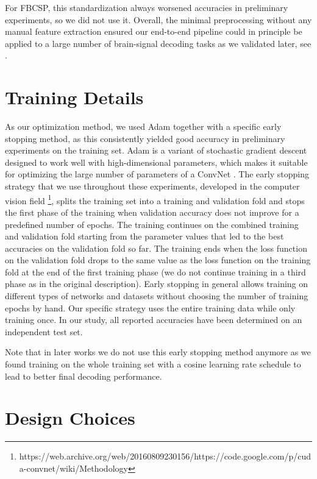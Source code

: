 For FBCSP, this standardization always worsened accuracies in
preliminary experiments, so we did not use it. Overall, the minimal
preprocessing without any manual feature extraction ensured our
end-to-end pipeline could in principle be applied to a large number of
brain-signal decoding tasks as we validated later, see
.

\section{Training Details}\label{training-details}

    As our optimization method, we used Adam
\cite{kingma_adam:_2014} together with a specific early
stopping method, as this consistently yielded good accuracy in
preliminary experiments on the training set. Adam is a variant of
stochastic gradient descent designed to work well with high-dimensional
parameters, which makes it suitable for optimizing the large number of
parameters of a ConvNet \cite{kingma_adam:_2014}. The early
stopping strategy that we use throughout these experiments, developed in
the computer vision field \footnote{https://web.archive.org/web/20160809230156/https://code.google.com/p/cuda-convnet/wiki/Methodology},
splits the training set into a training and validation fold and stops
the first phase of the training when validation accuracy does not
improve for a predefined number of epochs. The training continues on the
combined training and validation fold starting from the parameter values
that led to the best accuracies on the validation fold so far. The
training ends when the loss function on the validation fold drops to the
same value as the loss function on the training fold at the end of the
first training phase (we do not continue training in a third phase as in
the original description). Early stopping in general allows training on
different types of networks and datasets without choosing the number of
training epochs by hand. Our specific strategy uses the entire training
data while only training once. In our study, all reported accuracies
have been determined on an independent test set.

    Note that in later works we do not use this early stopping method
anymore as we found training on the whole training set with a cosine
learning rate schedule \cite{DBLP:conf/iclr/LoshchilovH17} to
lead to better final decoding performance.

\section{Design Choices}\label{design-choices}



